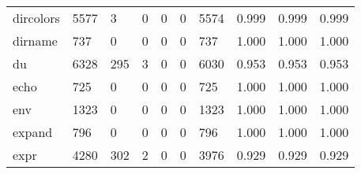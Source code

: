 \begin{longtable}{lp{1.3cm}p{1.3cm}p{1.3cm}p{1.3cm}p{1.3cm}p{1.3cm}p{1.3cm}p{1.3cm}p{1.3cm}}
dircolors &                   5577 &                                  3 &                                 0 &                                0 &                                 0 &                            5574 &                                0.999 &                                  0.999 &                                0.999 \\
dirname   &                    737 &                                  0 &                                 0 &                                0 &                                 0 &                             737 &                                1.000 &                                  1.000 &                                1.000 \\
du        &                   6328 &                                295 &                                 3 &                                0 &                                 0 &                            6030 &                                0.953 &                                  0.953 &                                0.953 \\
echo      &                    725 &                                  0 &                                 0 &                                0 &                                 0 &                             725 &                                1.000 &                                  1.000 &                                1.000 \\
env       &                   1323 &                                  0 &                                 0 &                                0 &                                 0 &                            1323 &                                1.000 &                                  1.000 &                                1.000 \\
expand    &                    796 &                                  0 &                                 0 &                                0 &                                 0 &                             796 &                                1.000 &                                  1.000 &                                1.000 \\
expr      &                   4280 &                                302 &                                 2 &                                0 &                                 0 &                            3976 &                                0.929 &                                  0.929 &                                0.929 \\

\end{longtable}

